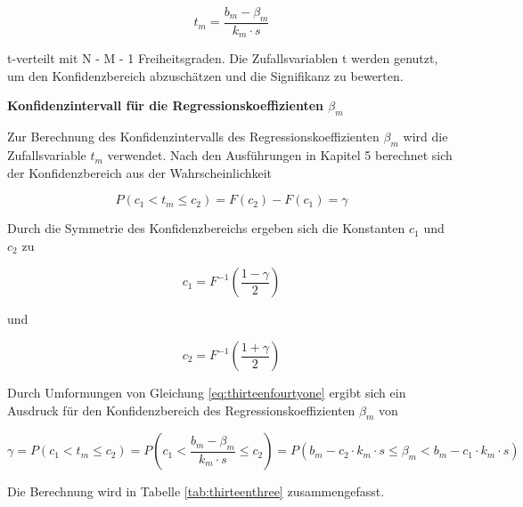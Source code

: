 \begin{equation}\label{eq:thirteenfourtyfour}
t_{m} =\frac{b_{m} -\beta _{m} }{k_{m} \cdot s}
\end{equation}

\noindent t-verteilt mit N - M - 1 Freiheitsgraden. Die Zufallsvariablen t werden genutzt, um den Konfidenzbereich abzusch\"{a}tzen und die Signifikanz zu bewerten.\bigskip

{\selectfont
\noindent\textbf{Konfidenzintervall f\"{u}r die Regressionskoeffizienten $\beta_{m}$}} \smallskip

\noindent Zur Berechnung des Konfidenzintervalls des Regressionskoeffizienten $\beta_{m}$ wird die Zufallsvariable $t_{m}$ verwendet. Nach den Ausf\"{u}hrungen in Kapitel 5 berechnet sich der Konfidenzbereich aus der Wahrscheinlichkeit

\begin{equation}\label{eq:thirteenfourtyfive}
P(c_{1} <t_{m} \le c_{2})=F(c_{2})-F(c_{1})=\gamma
\end{equation}

\noindent Durch die Symmetrie des Konfidenzbereichs ergeben sich die Konstanten $c_{1}$ und $c_{2}$ zu

\begin{equation}\label{eq:thirteenfourtysix}
c_{1} =F^{-1} \left(\frac{1-\gamma }{2} \right)
\end{equation}

\noindent und

\begin{equation}\label{eq:thirteenfourtyseven}
c_{2} =F^{-1} \left(\frac{1+\gamma }{2} \right)
\end{equation}

\noindent Durch Umformungen von Gleichung \eqref{eq:thirteenfourtyone} ergibt sich ein Ausdruck f\"{u}r den Konfidenzbereich des Regressionskoeffizienten $\beta_{m}$ von

\begin{equation}\label{eq:thirteenfourtyeight}
\gamma =P\left(c_{1} <t_{m} \le c_{2} \right)=P\left(c_{1} <\frac{b_{m} -\beta _{m} }{k_{m} \cdot s} \le c_{2} \right)=P\left(b_{m} -c_{2} \cdot k_{m} \cdot s\le \beta _{m} <b_{m} -c_{1} \cdot k_{m} \cdot s\right)
\end{equation}

\noindent Die Berechnung wird in Tabelle \ref{tab:thirteenthree} zusammengefasst.


